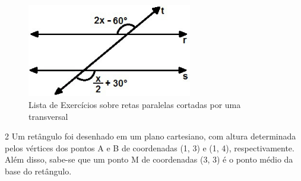 \begin{escolha}
\begin{boxmedio}
\begin{boxmedio}
{\begin{boxpeq}
\begin{boxpeq}
{\begin{boxpeq}
\begin{boxmedio}
\begin{boxmedio}
\begin{boxpeq}
\begin{boxmedio}
\begin{boxpeq}
\begin{boxpeq}
\begin{boxpeq}
\begin{boxpeq}
\begin{boxmedio}
{\begin{boxmedio}
\begin{boxmedio}
\begin{boxpeq}
\begin{boxmedio}
\begin{boxpeq}
\begin{boxpeq}
\begin{boxpeq}
\begin{escolha}
{\begin{boxmedio}
\begin{boxpeq}
\begin{boxpeq}
\begin{boxpeq}
\begin{boxpeq}
\begin{boxpeq}
\begin{boxmedio}
\begin{boxpeq}
\begin{boxpeq}
\begin{boxpeq}
{\begin{boxpeq}
\begin{boxmedio}
\begin{boxpeq}
\begin{boxpeq}
\begin{boxpeq}
{\begin{boxpeq}
\begin{boxmedio}
{\begin{boxpeq}
\begin{boxpeq}
\begin{boxmedio}
\begin{boxmedio}
\begin{boxpeq}
\begin{boxpeq}
{\begin{boxpeq}
\begin{boxpeq}
\begin{boxpeq}
\begin{boxpeq}
\begin{boxpeq}
\begin{escolha}
\begin{escolha}
{\begin{figure}
\centering
\includegraphics[width=2.83333in,height=1.60939in]{./_SAEB_9_MAT/media/image187.jpeg}
\caption{Lista de Exercícios sobre retas paralelas cortadas por uma
transversal}
\end{figure}


\begin{boxmedio}


\num{2} Um retângulo foi desenhado em um plano cartesiano, com altura
determinada pelos vértices dos pontos A e B de coordenadas (1, 3) e (1,
4), respectivamente. Além disso, sabe-se que um ponto M de
coordenadas (3, 3) é o ponto médio da base do retângulo.


\end{boxmedio}}
\end{escolha}
\end{escolha}
\end{boxpeq}
\end{boxpeq}
\end{boxpeq}
\end{boxpeq}
\end{boxpeq}}
\end{boxpeq}
\end{boxpeq}
\end{boxmedio}
\end{boxmedio}
\end{boxpeq}
\end{boxpeq}}
\end{boxmedio}
\end{boxpeq}}
\end{boxpeq}
\end{boxpeq}
\end{boxpeq}
\end{boxmedio}
\end{boxpeq}}
\end{boxpeq}
\end{boxpeq}
\end{boxpeq}
\end{boxmedio}
\end{boxpeq}
\end{boxpeq}
\end{boxpeq}
\end{boxpeq}
\end{boxpeq}
\end{boxmedio}}
\end{escolha}
\end{boxpeq}
\end{boxpeq}
\end{boxpeq}
\end{boxmedio}
\end{boxpeq}
\end{boxmedio}
\end{boxmedio}}
\end{boxmedio}
\end{boxpeq}
\end{boxpeq}
\end{boxpeq}
\end{boxpeq}
\end{boxmedio}
\end{boxpeq}
\end{boxmedio}
\end{boxmedio}
\end{boxpeq}}
\end{boxpeq}
\end{boxpeq}}
\end{boxmedio}
\end{boxmedio}
\end{escolha}
